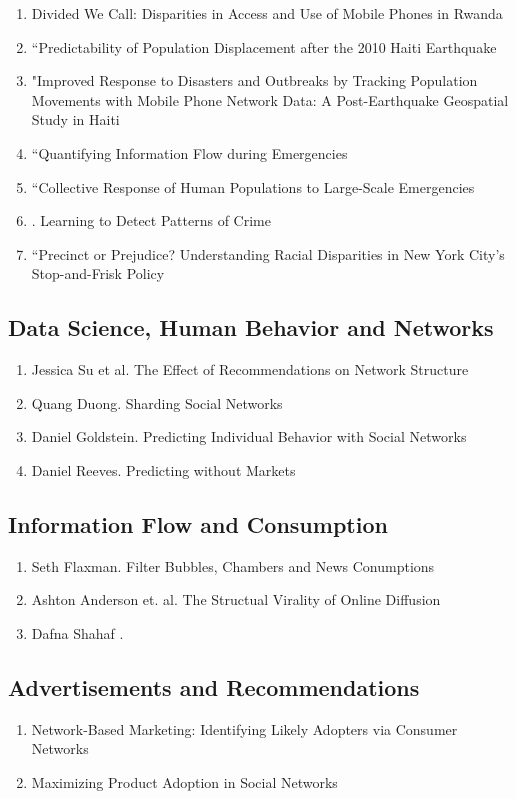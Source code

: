 \begin{enumerate}
\item Divided We Call: Disparities in Access and Use of Mobile Phones in Rwanda
\item “Predictability of Population Displacement after the 2010 Haiti Earthquake
\item "Improved Response to Disasters and Outbreaks by Tracking Population Movements with Mobile Phone Network Data: A Post-Earthquake Geospatial Study in Haiti
\item “Quantifying Information Flow during Emergencies
\item “Collective Response of Human Populations to Large-Scale Emergencies
\item . Learning to Detect Patterns of Crime
\item “Precinct or Prejudice? Understanding Racial Disparities in New York City’s Stop-and-Frisk Policy
\end{enumerate}

\subsection{Data Science, Human Behavior and Networks}
\begin{enumerate}
\item Jessica Su et al. The Effect of Recommendations on Network Structure
\item Quang Duong. Sharding Social Networks
\item Daniel Goldstein. Predicting Individual Behavior with Social Networks
\item Daniel Reeves. Predicting without Markets
\end{enumerate}


\subsection{Information Flow and Consumption}
\begin{enumerate}
\item Seth Flaxman. Filter Bubbles, Chambers and News Conumptions
\item Ashton Anderson et. al. The Structual Virality of Online Diffusion
\item Dafna Shahaf . \cite{Shahaf:2012:CTD:2086737.2086744} 
\end{enumerate}

\subsection{Advertisements and Recommendations}
\begin{enumerate}
\item Network-Based Marketing: Identifying Likely Adopters via Consumer Networks
\item Maximizing Product Adoption in Social Networks\cite{Bhagat:2012:MPA:2124295.2124368}
\end{enumerate}